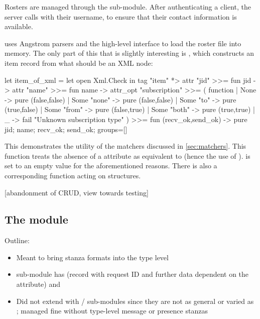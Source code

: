 Rosters are managed through the  sub-module. After authenticating a client, the server calls  with their username, to ensure that their contact information is available.

 uses Angstrom parsers and the high-level  interface to load the roster file into memory. The only part of this that is slightly interesting is , which constructs an item record from what should be an  XML node:

\begin{ocaml}
let item_of_xml =
  let open Xml.Check in
  tag "item" *> attr "jid" >>= fun jid ->
    attr "name" >>= fun name ->
      attr_opt "subscription" >>= ( function
      | None        -> pure (false,false)
      | Some "none" -> pure (false,false)
      | Some "to"   -> pure (true,false)
      | Some "from" -> pure (false,true)
      | Some "both" -> pure (true,true)
      | _ -> fail "Unknown subscription type" ) >>=
  fun (recv_ok,send_ok) ->
    pure { jid; name; recv_ok; send_ok; groups=[] }
\end{ocaml}

This demonstrates the utility of the  matchers discussed in \ref{sec:matchers}. This function treats the absence of a  attribute as equivalent to  (hence the use of ).  is set to an empty value for the aforementioned reasons. There is also a corresponding  function acting on  structures.

[abandonment of CRUD, view towards testing]

\subsection{The  module}
Outline:

\begin{itemize}
  \item Meant to bring stanza formats into the type level

  \item {} sub-module has  (record with request ID and further data dependent on the  attribute) and 

  \item Did not extend with  /  sub-modules since they are not as general or varied as ; managed fine without type-level message or presence stanzas
\end{itemize}

